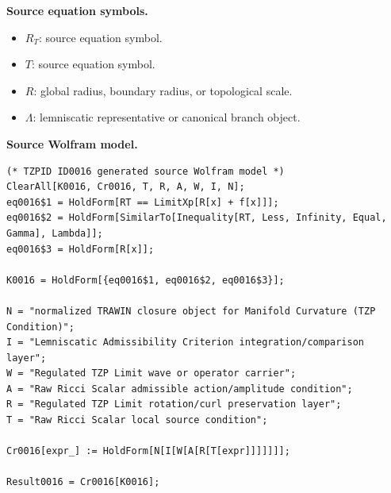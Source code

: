 \begin{minipage}[t]{0.49\linewidth}
\begingroup
\small
\raggedright
\textbf{Source equation symbols.}\par
\begin{itemize}[leftmargin=1.35em,itemsep=1pt,topsep=1pt,parsep=0pt]
    \item $R_{T}$: source equation symbol.
    \item $T$: source equation symbol.
    \item $R$: global radius, boundary radius, or topological scale.
    \item $\Lambda$: lemniscatic representative or canonical branch object.
\end{itemize}
\endgroup
\end{minipage}\hfill
\begin{minipage}[t]{0.47\linewidth}
\begingroup
\scriptsize
\raggedright
\textbf{Source Wolfram model.}\par
\begin{Verbatim}[fontsize=\tiny,breaklines=true,breakanywhere=true]
(* TZPID ID0016 generated source Wolfram model *)
ClearAll[K0016, Cr0016, T, R, A, W, I, N];
eq0016$1 = HoldForm[RT == LimitXp[R[x] + f[x]]];
eq0016$2 = HoldForm[SimilarTo[Inequality[RT, Less, Infinity, Equal, Gamma], Lambda]];
eq0016$3 = HoldForm[R[x]];

K0016 = HoldForm[{eq0016$1, eq0016$2, eq0016$3}];

N = "normalized TRAWIN closure object for Manifold Curvature (TZP Condition)";
I = "Lemniscatic Admissibility Criterion integration/comparison layer";
W = "Regulated TZP Limit wave or operator carrier";
A = "Raw Ricci Scalar admissible action/amplitude condition";
R = "Regulated TZP Limit rotation/curl preservation layer";
T = "Raw Ricci Scalar local source condition";

Cr0016[expr_] := HoldForm[N[I[W[A[R[T[expr]]]]]]];

Result0016 = Cr0016[K0016];
\end{Verbatim}
\endgroup
\end{minipage}

